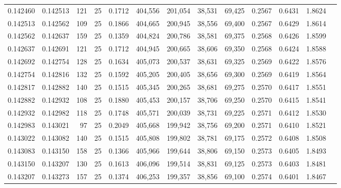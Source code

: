 \begin{tabular}{rrrrrrrrrrrrr}
0.142460 & 0.142513 &   121 &  25 &                                     0.1712 & 404,556 & 201,054 &  38,531 &  69,425 & 0.2567 & 0.6431 & 1.8624 \\
0.142513 & 0.142562 &   109 &  25 &                                     0.1866 & 404,665 & 200,945 &  38,556 &  69,400 & 0.2567 & 0.6429 & 1.8614 \\
0.142562 & 0.142637 &   159 &  25 &                                     0.1359 & 404,824 & 200,786 &  38,581 &  69,375 & 0.2568 & 0.6426 & 1.8599 \\
0.142637 & 0.142691 &   121 &  25 &                                     0.1712 & 404,945 & 200,665 &  38,606 &  69,350 & 0.2568 & 0.6424 & 1.8588 \\
0.142692 & 0.142754 &   128 &  25 &                                     0.1634 & 405,073 & 200,537 &  38,631 &  69,325 & 0.2569 & 0.6422 & 1.8576 \\
0.142754 & 0.142816 &   132 &  25 &                                     0.1592 & 405,205 & 200,405 &  38,656 &  69,300 & 0.2569 & 0.6419 & 1.8564 \\
0.142817 & 0.142882 &   140 &  25 &                                     0.1515 & 405,345 & 200,265 &  38,681 &  69,275 & 0.2570 & 0.6417 & 1.8551 \\
0.142882 & 0.142932 &   108 &  25 &                                     0.1880 & 405,453 & 200,157 &  38,706 &  69,250 & 0.2570 & 0.6415 & 1.8541 \\
0.142932 & 0.142982 &   118 &  25 &                                     0.1748 & 405,571 & 200,039 &  38,731 &  69,225 & 0.2571 & 0.6412 & 1.8530 \\
0.142983 & 0.143021 &    97 &  25 &                                     0.2049 & 405,668 & 199,942 &  38,756 &  69,200 & 0.2571 & 0.6410 & 1.8521 \\
0.143022 & 0.143082 &   140 &  25 &                                     0.1515 & 405,808 & 199,802 &  38,781 &  69,175 & 0.2572 & 0.6408 & 1.8508 \\
0.143083 & 0.143150 &   158 &  25 &                                     0.1366 & 405,966 & 199,644 &  38,806 &  69,150 & 0.2573 & 0.6405 & 1.8493 \\
0.143150 & 0.143207 &   130 &  25 &                                     0.1613 & 406,096 & 199,514 &  38,831 &  69,125 & 0.2573 & 0.6403 & 1.8481 \\
0.143207 & 0.143273 &   157 &  25 &                                     0.1374 & 406,253 & 199,357 &  38,856 &  69,100 & 0.2574 & 0.6401 & 1.8467 \\

\end{tabular}

